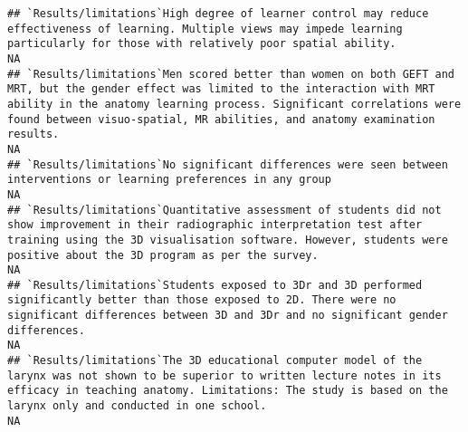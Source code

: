\documentclass[]{article}
\begin{document}
\begin{verbatim}
## `Results/limitations`High degree of learner control may reduce effectiveness of learning. Multiple views may impede learning particularly for those with relatively poor spatial ability.                                                                                                                                                                                                                                                                                             NA
## `Results/limitations`Men scored better than women on both GEFT and MRT, but the gender effect was limited to the interaction with MRT ability in the anatomy learning process. Significant correlations were found between visuo-spatial, MR abilities, and anatomy examination results.                                                                                                                                                                                              NA
## `Results/limitations`No significant differences were seen between interventions or learning preferences in any group                                                                                                                                                                                                                                                                                                                                                                  NA
## `Results/limitations`Quantitative assessment of students did not show improvement in their radiographic interpretation test after training using the 3D visualisation software. However, students were positive about the 3D program as per the survey.                                                                                                                                                                                                                               NA
## `Results/limitations`Students exposed to 3Dr and 3D performed significantly better than those exposed to 2D. There were no significant differences between 3D and 3Dr and no significant gender differences.                                                                                                                                                                                                                                                                          NA
## `Results/limitations`The 3D educational computer model of the larynx was not shown to be superior to written lecture notes in its efficacy in teaching anatomy. Limitations: The study is based on the larynx only and conducted in one school.                                                                                                                                                                                                                                       NA

\end{verbatim}
\end{document}
